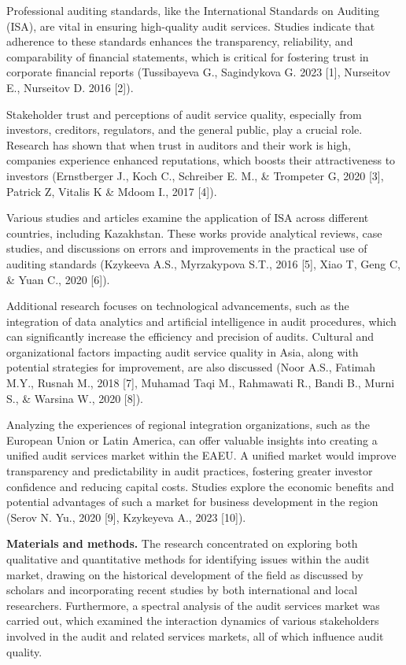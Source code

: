 \begin{multicols}{2}
Professional auditing standards, like the International Standards on
Auditing (ISA), are vital in ensuring high-quality audit services.
Studies indicate that adherence to these standards enhances the
transparency, reliability, and comparability of financial statements,
which is critical for fostering trust in corporate financial reports
(Tussibayeva G., Sagindykova G. 2023 {[}1{]}, Nurseitov E., Nurseitov D.
2016 {[}2{]}).

Stakeholder trust and perceptions of audit service quality, especially
from investors, creditors, regulators, and the general public, play a
crucial role. Research has shown that when trust in auditors and their
work is high, companies experience enhanced reputations, which boosts
their attractiveness to investors (Ernstberger J., Koch C., Schreiber E.
M., \& Trompeter G, 2020 {[}3{]}, Patrick Z, Vitalis K \& Mdoom I., 2017
{[}4{]}).

Various studies and articles examine the application of ISA across
different countries, including Kazakhstan. These works provide
analytical reviews, case studies, and discussions on errors and
improvements in the practical use of auditing standards (Kzykeeva A.S.,
Myrzakypova S.T., 2016 {[}5{]}, Xiao T, Geng C, \& Yuan C., 2020
{[}6{]}).

Additional research focuses on technological advancements, such as the
integration of data analytics and artificial intelligence in audit
procedures, which can significantly increase the efficiency and
precision of audits. Cultural and organizational factors impacting audit
service quality in Asia, along with potential strategies for
improvement, are also discussed (Noor A.S., Fatimah M.Y., Rusnah M.,
2018 {[}7{]}, Muhamad Taqi M., Rahmawati R., Bandi B., Murni S., \&
Warsina W., 2020 {[}8{]}).

Analyzing the experiences of regional integration organizations, such as
the European Union or Latin America, can offer valuable insights into
creating a unified audit services market within the EAEU. A unified
market would improve transparency and predictability in audit practices,
fostering greater investor confidence and reducing capital costs.
Studies explore the economic benefits and potential advantages of such a
market for business development in the region (Serov N. Yu., 2020
{[}9{]}, Kzykeyeva A., 2023 {[}10{]}).

\textbf{Materials and methods.} The research concentrated on exploring
both qualitative and quantitative methods for identifying issues within
the audit market, drawing on the historical development of the field as
discussed by scholars and incorporating recent studies by both
international and local researchers. Furthermore, a spectral analysis of
the audit services market was carried out, which examined the
interaction dynamics of various stakeholders involved in the audit and
related services markets, all of which influence audit quality.


\end{multicols}
